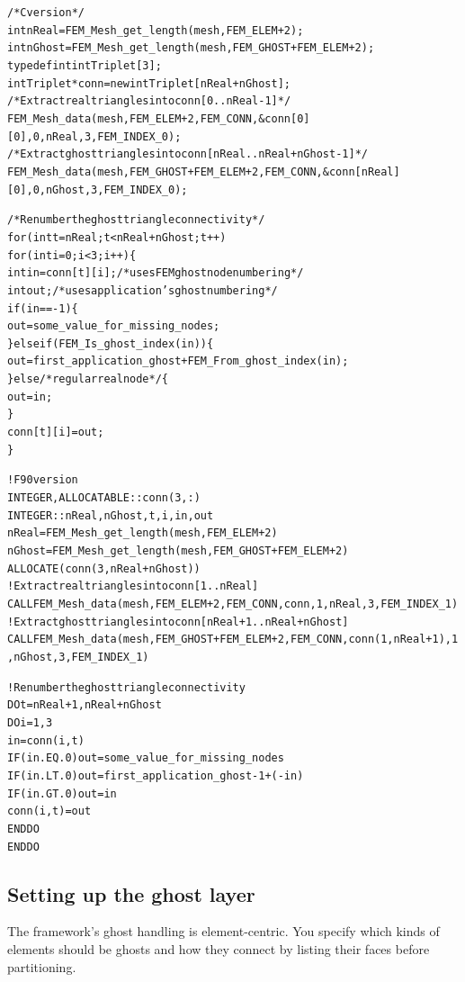 \begin{alltt}
/* C version */
  int nReal=FEM\_Mesh\_get\_length(mesh,FEM\_ELEM+2);
  int nGhost=FEM\_Mesh\_get\_length(mesh,FEM\_GHOST+FEM\_ELEM+2);
  typedef int intTriplet[3];
  intTriplet *conn=new intTriplet[nReal+nGhost];
  /* Extract real triangles into conn[0..nReal-1] */
  FEM\_Mesh\_data(mesh,FEM\_ELEM+2,FEM\_CONN, &conn[0][0], 0,nReal, 3,FEM\_INDEX\_0);
  /* Extract ghost triangles into conn[nReal..nReal+nGhost-1] */
  FEM\_Mesh\_data(mesh,FEM\_GHOST+FEM\_ELEM+2,FEM\_CONN, &conn[nReal][0], 0,nGhost, 3,FEM\_INDEX\_0);
  
  /* Renumber the ghost triangle connectivity */
  for (int t=nReal;t<nReal+nGhost;t++)
    for (int i=0;i<3;i++) \{
      int in=conn[t][i]; /* uses FEM ghost node numbering */
      int out; /* uses application's ghost numbering */
      if (in==-1) \{ 
        out=some\_value\_for\_missing\_nodes; 
      \} else if (FEM\_Is\_ghost\_index(in)) \{
        out=first\_application\_ghost+FEM\_From\_ghost\_index(in);
      \} else /*regular real node*/ \{
        out=in;
      \}
      conn[t][i]=out;
    \}

! F90 version
  INTEGER, ALLOCATABLE :: conn(3,:)
  INTEGER :: nReal,nGhost,t,i,in,out
  nReal=FEM\_Mesh\_get\_length(mesh,FEM\_ELEM+2)
  nGhost=FEM\_Mesh\_get\_length(mesh,FEM\_GHOST+FEM\_ELEM+2)
  ALLOCATE(conn(3,nReal+nGhost))
  ! Extract real triangles into conn[1..nReal] 
  CALL FEM\_Mesh\_data(mesh,FEM\_ELEM+2,FEM\_CONN, conn, 1,nReal, 3,FEM\_INDEX\_1)
  ! Extract ghost triangles into conn[nReal+1..nReal+nGhost] 
  CALL FEM\_Mesh\_data(mesh,FEM\_GHOST+FEM\_ELEM+2,FEM\_CONN, conn(1,nReal+1), 1,nGhost, 3,FEM\_INDEX\_1)
  
  ! Renumber the ghost triangle connectivity 
  DO t=nReal+1,nReal+nGhost
    DO i=1,3
      in=conn(i,t) 
      IF (in .EQ. 0) out=some\_value\_for\_missing\_nodes
      IF (in .LT. 0) out=first\_application\_ghost-1+(-in)
      IF (in .GT. 0) out=in
      conn(i,t)=out
    END DO
  END DO
  
  
\end{alltt}



\subsection{Setting up the ghost layer}
The framework's ghost handling is element-centric. You specify which kinds of elements should be ghosts and how they connect by listing their faces before partitioning.  


